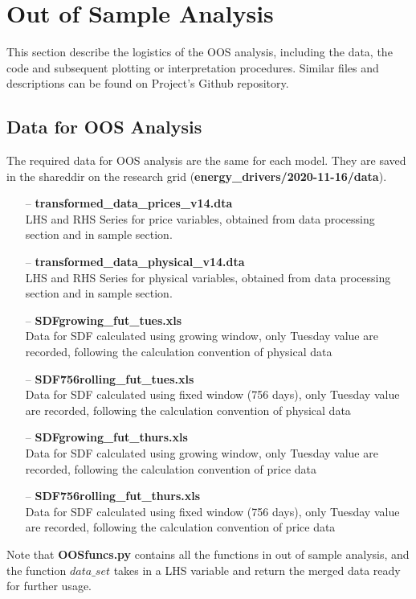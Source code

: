 \documentclass[11pt]{article}
\begin{document}
\section{Out of Sample Analysis}
This section describe the logistics of the OOS analysis, including the data, the code and subsequent plotting or interpretation procedures. Similar files and descriptions can be found on Project's Github repository. 
\subsection{Data for OOS Analysis}
The required data for OOS analysis are the same for each model. They are saved in the shareddir on the research grid (\textbf{energy\_drivers/2020-11-16/data}).
\begin{enumerate}
	\item[--] \textbf{transformed\_data\_prices\_v14.dta} \\
	LHS and RHS Series for price variables, obtained from data processing section and in sample section.
	\item[--] \textbf{transformed\_data\_physical\_v14.dta} \\
	LHS and RHS Series for physical variables, obtained from data processing section and in sample section.
	\item[--] \textbf{SDFgrowing\_fut\_tues.xls} \\
	Data for SDF calculated using growing window, only Tuesday value are recorded, following the calculation convention of physical data
	\item[--] \textbf{SDF756rolling\_fut\_tues.xls} \\
	Data for SDF calculated using fixed window (756 days), only Tuesday value are recorded, following the calculation convention of physical data
	\item[--] \textbf{SDFgrowing\_fut\_thurs.xls} \\
	Data for SDF calculated using growing window, only Tuesday value are recorded, following the calculation convention of price data
	\item[--] \textbf{SDF756rolling\_fut\_thurs.xls} \\
	Data for SDF calculated using fixed window (756 days), only Tuesday value are recorded, following the calculation convention of price data
\end{enumerate}
Note that \textbf{OOSfuncs.py} contains all the functions in out of sample analysis, and the function $data\_set$ takes in a LHS variable and return the merged data ready for further usage.
\end{document}

